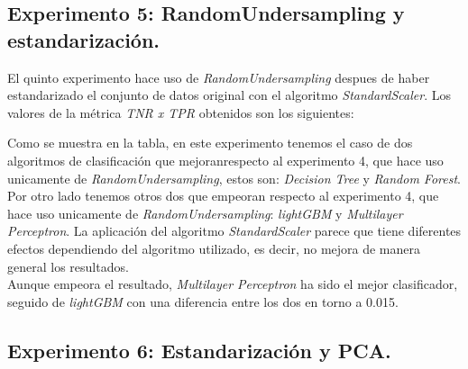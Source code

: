 \documentclass[11pt]{article}
\begin{document}
\subsection{Experimento 5: RandomUndersampling y estandarización.}

El quinto experimento hace uso de \textit{RandomUndersampling} despues de haber estandarizado el conjunto de datos original con el algoritmo \textit{StandardScaler}. Los valores de la métrica \textit{TNR x TPR} obtenidos son los siguientes:

\begin{table}[H]
	\centering
\end{table}

Como se muestra en la tabla, en este experimento tenemos el caso de dos algoritmos de clasificación que mejoranrespecto al experimento 4, que hace uso unicamente de \textit{RandomUndersampling}, estos son: \textit{Decision Tree} y \textit{Random Forest}. Por otro lado tenemos otros dos que empeoran respecto al experimento 4, que hace uso unicamente de \textit{RandomUndersampling}: \textit{lightGBM} y \textit{Multilayer Perceptron}. La aplicación del algoritmo \textit{StandardScaler} parece que tiene diferentes efectos dependiendo del algoritmo utilizado, es decir, no mejora de manera general los resultados.\\

Aunque empeora el resultado, \textit{Multilayer Perceptron} ha sido el mejor clasificador, seguido de  \textit{lightGBM} con una diferencia entre los dos en torno a 0.015.

\subsection{Experimento 6: Estandarización y PCA.}
\end{document}
